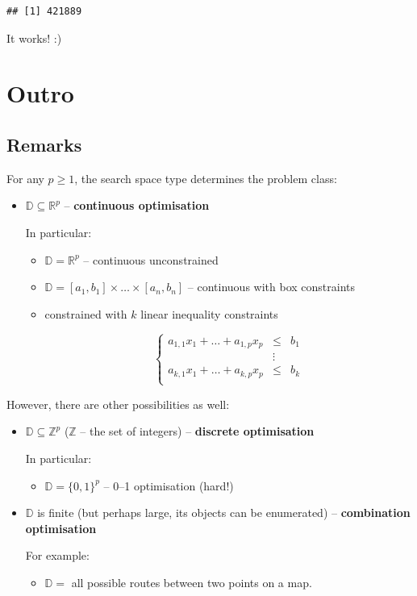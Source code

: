 \documentclass[10pt,b5paper,krantz1]{krantz}
\providecommand{\tightlist}{%
  \setlength{\itemsep}{0pt}\setlength{\parskip}{0pt}}
\begin{document}
\begin{verbatim}
## [1] 421889
\end{verbatim}

It works! :)

\hypertarget{outro-7}{%
\section{Outro}\label{outro-7}}

\hypertarget{remarks-7}{%
\subsection{Remarks}\label{remarks-7}}

For any \(p\ge 1\), the search space type determines the problem class:

\begin{itemize}
\item
  \(\mathbb{D}\subseteq\mathbb{R}^p\) -- \textbf{continuous optimisation}

  In particular:

  \begin{itemize}
  \item
    \(\mathbb{D}=\mathbb{R}^p\) -- continuous unconstrained
  \item
    \(\mathbb{D}=[a_1,b_1]\times\dots\times[a_n,b_n]\) -- continuous with box constraints
  \item
    constrained with \(k\) linear inequality constraints

    \[
      \left\{
      \begin{array}{lll}
      a_{1,1} x_1 + \dots + a_{1,p} x_p &\le& b_1 \\
      &\vdots&\\
      a_{k,1} x_1 + \dots + a_{k,p} x_p &\le& b_k \\
      \end{array}
      \right.
      \]
  \end{itemize}
\end{itemize}

However, there are other possibilities as well:

\begin{itemize}
\item
  \(\mathbb{D}\subseteq\mathbb{Z}^p\) (\(\mathbb{Z}\) -- the set of integers) -- \textbf{discrete optimisation}

  In particular:

  \begin{itemize}
  \tightlist
  \item
    \(\mathbb{D}=\{0,1\}^p\) -- 0--1 optimisation (hard!)
  \end{itemize}
\item
  \(\mathbb{D}\) is finite (but perhaps large, its objects can be enumerated) -- \textbf{combination optimisation}

  For example:

  \begin{itemize}
  \tightlist
  \item
    \(\mathbb{D}=\) all possible routes between two points on a map.
  \end{itemize}
\end{itemize}
\end{document}
